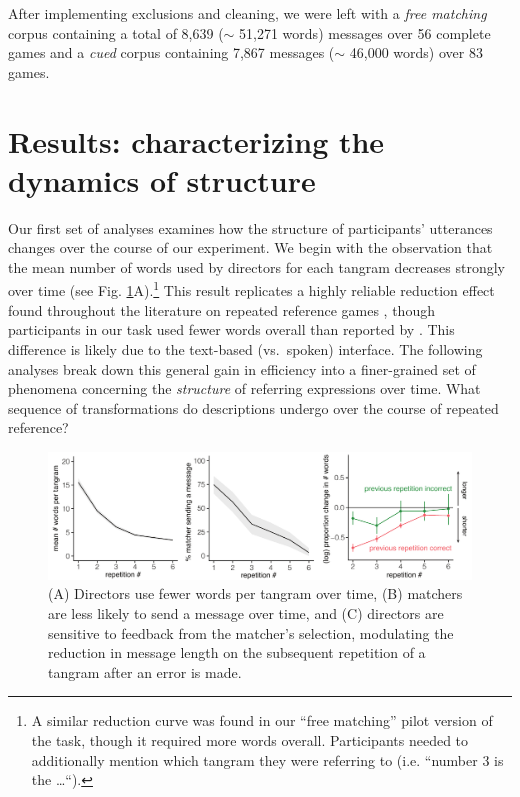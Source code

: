 \documentclass[alpha-refs]{wiley-article}
\begin{document}
\begin{enumerate}
After implementing exclusions and cleaning, we were left with a \emph{free matching} corpus containing a total of 8,639 ($\sim$ 51,271 words) messages over 56 complete games and a \emph{cued} corpus containing 7,867 messages ($\sim$ 46,000 words) over 83 games.

\end{enumerate}


\section{Results: characterizing the dynamics of structure}
\label{sec:structure}

Our first set of analyses examines how the structure of participants' utterances changes over the course of our experiment.
We begin with the observation that the mean number of words used by directors for each tangram decreases strongly over time (see Fig. \ref{fig:feedback}A).\footnote{A similar reduction curve was found in our  ``free matching'' pilot version of the task, though it required more words overall. Participants needed to additionally mention which tangram they were referring to (i.e. ``number 3 is the \dots``).}
This result replicates a highly reliable reduction effect found throughout the literature on repeated reference games \citep[e.g.][]{KraussWeinheimer64_ReferencePhrases,BrennanClark96_ConceptualPactsConversation}, though participants in our task used fewer words overall than reported by \cite{ClarkWilkesGibbs86_ReferringCollaborative}.
This difference is likely due to the text-based (vs.~spoken) interface.
The following analyses break down this general gain in efficiency into a finer-grained set of phenomena concerning the \emph{structure} of referring expressions over time.
What sequence of transformations do descriptions undergo over the course of repeated reference?


\begin{figure}[t]
\centering
\includegraphics[scale=.64]{listenerFeedback_combined.pdf}
\caption{(A) Directors use fewer words per tangram over time, (B) matchers are less likely to send a message over time, and (C) directors are sensitive to feedback from the matcher's selection, modulating the reduction in message length on the subsequent repetition of a tangram after an error is made.}
\label{fig:feedback}
\end{figure}
\end{document}
